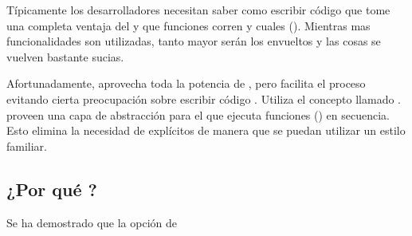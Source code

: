 Típicamente los desarrolladores necesitan saber como escribir código que tome una completa ventaja del \eventloopCPT y que funciones corren \synchronously y cuales \asynchronously (). Mientras mas funcionalidades \asynchronously son utilizadas, tanto mayor serán los \callbacksPL envueltos y las cosas se vuelven bastante sucias.

Afortunadamente, \meteorNAME aprovecha toda la potencia de \eventloopCPT, pero facilita el proceso evitando cierta preocupación sobre escribir código \asynchronousCPT. Utiliza el concepto llamado \fibers \behindthescenes. \fibers proveen una capa de abstracción para el \eventloopCPT que ejecuta funciones \asynchronousCPT(\tasks) en secuencia. Esto elimina la necesidad de \callbacksPL explícitos de manera que se puedan utilizar un estilo \synchronousCPT familiar.

\subsection{¿Por qué \meteorNAME?}

Se ha demostrado que la opción de \